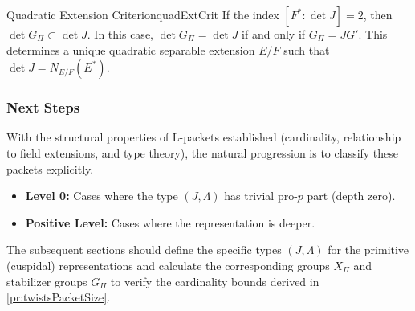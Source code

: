 \documentclass{article}
\begin{document}
\begin{prop}{Quadratic Extension Criterion}{quadExtCrit}
  If the index \([F^* : \det J] = 2\), then \(\det G_\Pi \subset \det J\).
  In this case, \(\det G_\Pi = \det J\) if and only if \(G_\Pi = JG'\).
  This determines a unique quadratic separable extension \(E/F\) such that \(\det J = N_{E/F}(E^*)\).
\end{prop}

\subsubsection*{Next Steps}

With the structural properties of L-packets established (cardinality, relationship to field extensions, and type theory), the natural progression is to classify these packets explicitly.
\begin{itemize}
    \item \textbf{Level 0:} Cases where the type \((J, \Lambda)\) has trivial pro-\(p\) part (depth zero).
    \item \textbf{Positive Level:} Cases where the representation is deeper.
\end{itemize}
The subsequent sections should define the specific types \((J, \Lambda)\) for the primitive (cuspidal)
representations and calculate the corresponding groups \(X_\Pi\) and stabilizer groups \(G_\Pi\) to verify the
cardinality bounds derived in \cref{pr:twistsPacketSize}.




\newpage
\printbibliography
\end{document}
